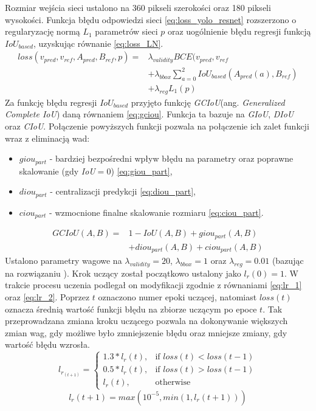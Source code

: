 Rozmiar wejścia sieci ustalono na 360 pikseli szerokości oraz 180 pikseli wysokości.
Funkcja błędu odpowiedzi sieci \eqref{eq:loss_yolo_resnet} rozszerzono o regularyzację normą $L_1$ parametrów sieci $p$ oraz uogólnienie błędu regresji funkcją $IoU_{based}$, uzyskując równanie \eqref{eq:loss_LN}.
\begin{equation}
\begin{aligned}
loss(v_{pred},v_{ref},A_{pred}, B_{ref}, p) 
=& \lambda_{validity} BCE(v_{pred}, v_{ref} \\
&+ \lambda_{bbox} \sum_{a = 0}^{2} IoU_{based}(A_{pred}(a), B_{ref}) \\
&+ \lambda_{reg} L_1(p)
\end{aligned}
\label{eq:loss_LN}
\end{equation}
Za funkcję błędu regresji $IoU_{based}$ przyjęto funkcję \emph{GCIoU}(ang. \emph{Generalized Complete IoU}) daną równaniem \eqref{eq:gciou}. 
Funkcja ta bazuje na \emph{GIoU}\cite{giou}, \emph{DIoU}\cite{dciou} oraz \emph{CIoU}\cite{dciou}. 
Połączenie powyższych funkcji pozwala na połączenie ich zalet funkcji wraz z eliminacją wad: 
\begin{itemize}
    \item $giou_{part}$ - bardziej bezpośredni wpływ błędu na parametry oraz poprawne skalowanie (gdy \emph{IoU}$ = 0$) \eqref{eq:giou_part},
    \item $diou_{part}$ - centralizacji predykcji \eqref{eq:diou_part},
    \item $ciou_{part}$ - wzmocnione finalne skalowanie rozmiaru \eqref{eq:ciou_part}. 
\end{itemize}
\begin{equation}
\begin{aligned}
GCIoU(A,B) =& 1 - IoU(A,B) + giou_{part}(A,B)\\ 
&+ diou_{part}(A,B) + ciou_{part}(A,B)
\end{aligned}
\label{eq:gciou}
\end{equation}
Ustalono parametry wagowe na $\lambda_{validity} = 20$, $\lambda_{bbox} = 1$ oraz $\lambda_{reg} = 0.01$ (bazując na rozwiązaniu \cite{ultra_net}).
Krok uczący został początkowo ustalony jako $l_r(0)=1$. 
W trakcie procesu uczenia podlegał on modyfikacji zgodnie z równaniami \eqref{eq:lr_1} oraz \eqref{eq:lr_2}.
Poprzez $t$ oznaczono numer epoki uczącej, natomiast $loss(t)$ oznacza średnią wartość funkcji błędu na zbiorze uczącym po epoce $t$.
Tak przeprowadzana zmiana kroku uczącego pozwala na dokonywanie większych zmian wag, gdy możliwe było zmniejszenie błędu oraz mniejsze zmiany, gdy wartość błędu wzrosła.
\begin{equation}
l_r_(t+1) = 
\begin{cases}
    1.3*l_r(t), &\text{if } loss(t) < loss(t-1) \\
    0.5*l_r(t), &\text{if } loss(t) > loss(t-1) \\
    l_r(t), &\text{otherwise}
\end{cases}
\label{eq:lr_1}
\end{equation}
\begin{equation}
l_r(t+1) = max(10^{-5}, min(1, l_r(t+1)))
\label{eq:lr_2}
\end{equation}


